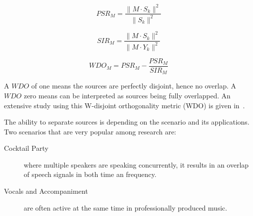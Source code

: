 \begin{equation}
    PSR_{M} = \frac{\|M \cdot S_{k}\|^{2}}{\|S_{k}\|^{2}}
\end{equation}

\begin{equation}
    SIR_{M}=\frac{\|M \cdot S_{k}\|^{2}}{\|M \cdot Y_{k}\|^{2}}
\end{equation}

\begin{equation}
    WDO_{M} = PSR_{M} - \frac{PSR_{M}}{SIR_{M}}
\end{equation}

A \(WDO\) of one means the sources are perfectly disjoint, hence no overlap.
A \(WDO\) zero means can be interpreted as sources being fully overlapped.
An extensive study using this W-disjoint orthogonality metric (WDO) is given in~\cite{rickard02}.
\par
The ability to separate sources is depending on the scenario and its applications.
Two scenarios that are very popular among research are:

\begin{description}
  \item[Cocktail Party] where multiple speakers are speaking concurrently, it results in an overlap of speech signals in both time an frequency. 
  \item[Vocals and Accompaniment] are often active at the same time in professionally produced music.
\end{description}

